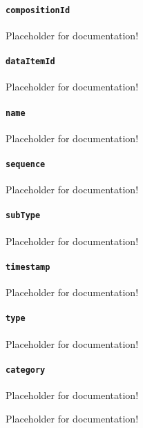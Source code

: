 \paragraph{\texttt{compositionId}}\mbox{}
\newline\tab Placeholder for documentation!

\paragraph{\texttt{dataItemId}}\mbox{}
\newline\tab Placeholder for documentation!

\paragraph{\texttt{name}}\mbox{}
\newline\tab Placeholder for documentation!

\paragraph{\texttt{sequence}}\mbox{}
\newline\tab Placeholder for documentation!

\paragraph{\texttt{subType}}\mbox{}
\newline\tab Placeholder for documentation!

\paragraph{\texttt{timestamp}}\mbox{}
\newline\tab Placeholder for documentation!

\paragraph{\texttt{type}}\mbox{}
\newline\tab Placeholder for documentation!

\paragraph{\texttt{category}}\mbox{}
\newline\tab Placeholder for documentation!

Placeholder for documentation!

